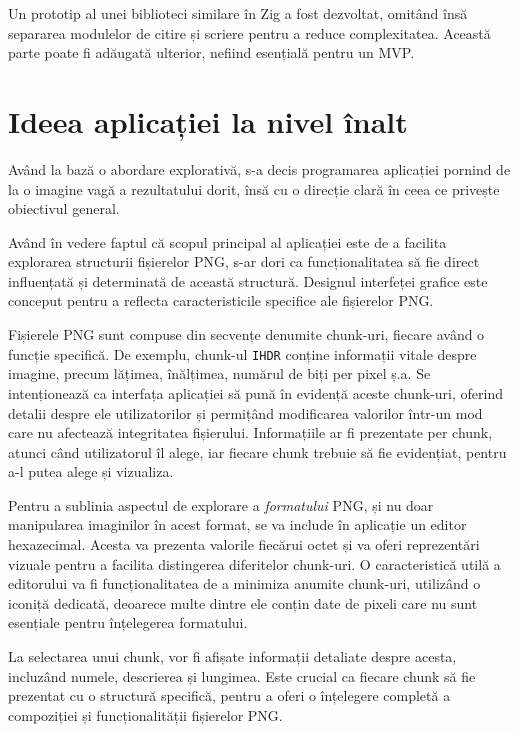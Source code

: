 \documentclass[a4paper,12pt]{report}
\begin{document}
Un prototip al unei biblioteci similare în Zig a fost dezvoltat,
omitând însă separarea modulelor de citire și scriere pentru a reduce complexitatea.
Această parte poate fi adăugată ulterior, nefiind esențială pentru un \ac{MVP}.

\section{Ideea aplicației la nivel înalt}

Având la bază o abordare explorativă, s-a decis programarea aplicației
pornind de la o imagine vagă a rezultatului dorit,
însă cu o direcție clară în ceea ce privește obiectivul general.

Având în vedere faptul că scopul principal al aplicației
este de a facilita explorarea structurii fișierelor \ac{PNG},
s-ar dori ca funcționalitatea să fie direct
influențată și determinată de această structură.
Designul interfeței grafice este conceput pentru a reflecta
caracteristicile specifice ale fișierelor \ac{PNG}.

Fișierele \ac{PNG} sunt compuse din secvențe denumite chunk-uri,
fiecare având o funcție specifică.
De exemplu, chunk-ul \texttt{IHDR} conține informații vitale despre imagine,
precum lățimea, înălțimea, numărul de biți per pixel ș.a.
Se intenționează ca interfața aplicației să pună
în evidență aceste chunk-uri, oferind detalii despre ele utilizatorilor
și permițând modificarea valorilor într-un mod
care nu afectează integritatea fișierului.
Informațiile ar fi prezentate per chunk, atunci când utilizatorul îl alege,
iar fiecare chunk trebuie să fie evidențiat, pentru a-l putea alege și vizualiza.

Pentru a sublinia aspectul de explorare a \textit{formatului} \ac{PNG},
și nu doar manipularea imaginilor în acest format,
se va include în aplicație un editor hexazecimal.
Acesta va prezenta valorile fiecărui octet și
va oferi reprezentări vizuale pentru a facilita distingerea diferitelor chunk-uri.
O caracteristică utilă a editorului va fi funcționalitatea
de a minimiza anumite chunk-uri, utilizând o iconiță dedicată,
deoarece multe dintre ele conțin date de pixeli
care nu sunt esențiale pentru înțelegerea formatului.

La selectarea unui chunk, vor fi afișate informații detaliate despre acesta,
incluzând numele, descrierea și lungimea.
Este crucial ca fiecare chunk să fie prezentat cu o structură specifică,
pentru a oferi o înțelegere completă a compoziției și funcționalității fișierelor \ac{PNG}.
\end{document}
